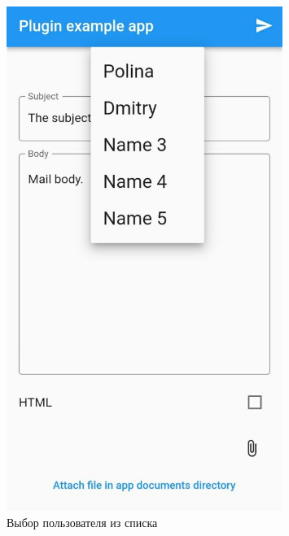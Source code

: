 \documentclass[a4paper, 14pt]{extarticle}
\begin{document}
\begin{figure}[!htb]
	\centering
	\includegraphics[width=0.8\textwidth]{img2}
\caption{Выбор пользователя из списка}
\label{fig:img2}
\end{figure}
\end{document}
